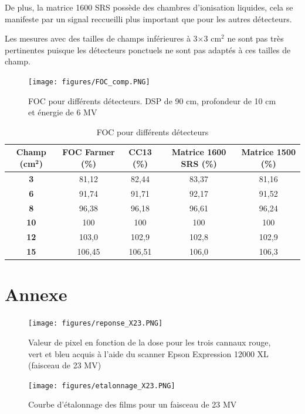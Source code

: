 \documentclass{book}
\begin{document}
De plus, la matrice 1600 SRS possède des chambres d'ionisation liquides, cela se manifeste par un signal reccueilli plus important que pour les autres détecteurs.

Les mesures avec des tailles de champs inférieures à 3$\times$3 cm$^2$ ne sont pas très pertinentes puisque les détecteurs ponctuels ne sont pas adaptés à ces tailles de champ.

\begin{figure}[h]
  \centering
  \texttt{[image: figures/FOC\_comp.PNG]}
  \caption{FOC pour différents détecteurs. DSP de 90 cm, profondeur de 10 cm et énergie de 6 MV}
  \label{fig_foc}
\end{figure}

\begin{table}[h]
  \begin{tabular}{ccccc}
  \toprule
  \textbf{Champ (cm}$\mathbf{^2}$\textbf{)} & \textbf{FOC Farmer (\%)} & \textbf{CC13 (\%)} & \textbf{Matrice 1600 SRS (\%)} & \textbf{Matrice 1500 (\%)} \\ \toprule
  \textbf{3} & 81,12 & 82,44 & 83,37 & 81,16 \\
  \textbf{6} & 91,74 & 91,71 & 92,17 & 91,52 \\
  \textbf{8} & 96,38 & 96,18 & 96,61 & 96,24 \\
  \textbf{10} & 100 & 100 & 100 & 100 \\
  \textbf{12} & 103,0 & 102,9 & 102,8 & 102,9 \\
  \textbf{15} & 106,45 & 106,51 & 106,0 & 106,3 \\ \bottomrule
  \end{tabular}
  \caption{FOC pour différents détecteurs}
  \label{table_foc}
\end{table}

\chapter*{Annexe}

\begin{figure}[h]
  \centering
  \texttt{[image: figures/reponse\_X23.PNG]}
  \caption{Valeur de pixel en fonction de la dose pour les trois cannaux rouge, vert et bleu acquis à l'aide du scanner Epson Expression 12000 XL (faisceau de 23 MV)}
  \label{fig_reponse_scanner_X23}
\end{figure}

\begin{figure}[h]
  \centering
  \texttt{[image: figures/etalonnage\_X23.PNG]}
  \caption{Courbe d'étalonnage des films pour un faisceau de 23 MV}
  \label{fig_courbe_etalonnage_X23}
\end{figure}
\end{document}
